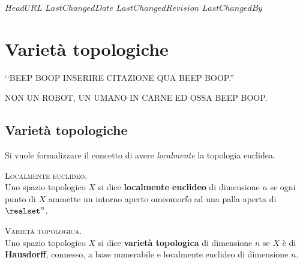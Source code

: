 \svnidlong
{$HeadURL$}
{$LastChangedDate$}
{$LastChangedRevision$}
{$LastChangedBy$}

\chapter{Varietà topologiche}

\begin{introduction}
	‘‘BEEP BOOP INSERIRE CITAZIONE QUA BEEP BOOP.''
	\begin{flushright}
		\textsc{NON UN ROBOT,} UN UMANO IN CARNE ED OSSA BEEP BOOP.
	\end{flushright}
\end{introduction}

\section{Varietà topologiche}
Si vuole formalizzare il concetto di avere \textit{localmente} la topologia euclidea. 
\begin{define}\textsc{Localmente euclideo.}\\
	Uno spazio topologico $X$ si dice \textbf{localmente euclideo} di dimensione $n$ se ogni punto di $X$ ammette un intorno aperto omeomorfo ad una palla aperta di $\realset^n$.
\end{define}

\begin{define}\textsc{Varietà topologica.}\\
	Uno spazio topologico $X$ si dice \textbf{varietà topologica} di dimensione $n$ se $X$ è di \textbf{Hausdorff}, connesso, a base numerabile e localmente euclideo di dimensione $n$.
\end{define}

